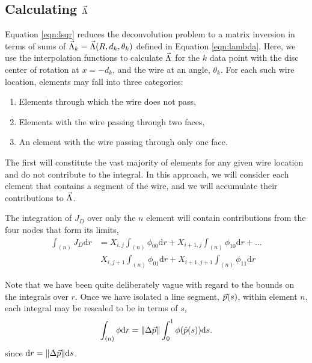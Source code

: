 \subsection{Calculating $\vec{\Lambda}$}\label{sec:lambda}

Equation \ref{eqn:lsqr} reduces the deconvolution problem to a matrix inversion in terms of sums of $\vec{\Lambda}_k = \vec{\Lambda}(R,d_k,\theta_k)$ defined in Equation \ref{eqn:lambda}.  Here, we use the interpolation functions to calculate $\vec{\Lambda}$ for the $k$ data point with the disc center of rotation at $x=-d_k$, and the wire at an angle, $\theta_k$.  For each such wire location, elements may fall into three categories:
\begin{enumerate}
\item Elements through which the wire does not pass,
\item Elements with the wire passing through two faces,
\item An element with the wire passing through only one face.
\end{enumerate}
The first will constitute the vast majority of elements for any given wire location and do not contribute to the integral.  In this approach, we will consider each element that contains a segment of the wire, and we will accumulate their contributions to $\vec{\Lambda}$.

The integration of $J_D$ over only the $n$ element will contain contributions from the four nodes that form its limits,
\begin{align}
\int_{(n)} J_D \mathrm{d} r &= X_{i,j} \int_{(n)} \phi_{00} \mathrm{d} r + X_{i+1,j} \int_{(n)} \phi_{10} \mathrm{d} r + \ldots \nonumber\\
&\ X_{i,j+1} \int_{(n)} \phi_{01} \mathrm{d} r + X_{i+1,j+1} \int_{(n)} \phi_{11} \mathrm{d} r \label{eqn:intJD:element}
\end{align}

Note that we have been quite deliberately vague with regard to the bounds on the integrals over $r$.  Once we have isolated a line segment, $\vec{p}(s)$, within element $n$, each integral may be rescaled to be in terms of $s$,
\begin{align}
\int_{(n)} \phi \mathrm{d}r = \|\Delta\vec{p}\| \int_0^1 \phi(\hat{p}(s)) \mathrm{d} s.
\end{align}
since $\mathrm{d} r = \|\Delta \vec{p}\| \mathrm{d} s$.

